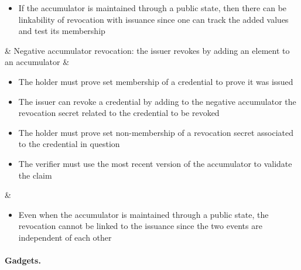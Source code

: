 {\begin{landscape}
\begin{funcprivtabular}{.1927}{.3327}{.3327}{.3327}
\begin{itemize}
		\item If the accumulator is maintained through a public state, then there can be linkability of revocation with issuance since one can track the added values and test its membership
		\end{itemize}
	\rowend
	& Negative accumulator revocation: the issuer revokes by adding an element to an accumulator
	& \begin{itemize}
		\item The holder must prove set membership of a credential to prove it was issued
		\item The issuer can revoke a credential by adding to the negative accumulator the revocation secret related to the credential to be revoked
		\item The holder must prove set non-membership of a revocation secret 	
		associated to the credential in question
		\item The verifier must use the most recent version of the accumulator to validate the claim
		\end{itemize}
	& \begin{itemize}
		\item Even when the accumulator is maintained through a public state, the revocation cannot be linked to the issuance since the two events are independent of each other
		\end{itemize}
	\rowend
\hline
\end{funcprivtabular}

\end{landscape}
} %

\paragraph{Gadgets.}

